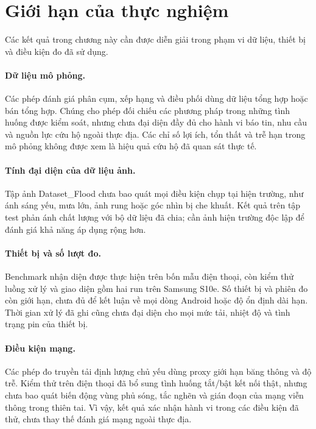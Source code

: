 \section{Giới hạn của thực nghiệm}\label{sec:04-evaluation-limitations}
Các kết quả trong chương này cần được diễn giải trong phạm vi dữ liệu, thiết bị và điều kiện đo đã sử dụng.

\paragraph{Dữ liệu mô phỏng.}
Các phép đánh giá phân cụm, xếp hạng và điều phối dùng dữ liệu tổng hợp hoặc bán tổng hợp. Chúng cho phép đối chiếu các phương pháp trong những tình huống được kiểm soát, nhưng chưa đại diện đầy đủ cho hành vi báo tin, nhu cầu và nguồn lực cứu hộ ngoài thực địa. Các chỉ số lợi ích, tổn thất và trễ hạn trong mô phỏng không được xem là hiệu quả cứu hộ đã quan sát thực tế.

\paragraph{Tính đại diện của dữ liệu ảnh.}
Tập ảnh Dataset\_Flood chưa bao quát mọi điều kiện chụp tại hiện trường, như ánh sáng yếu, mưa lớn, ảnh rung hoặc góc nhìn bị che khuất. Kết quả trên tập test phản ánh chất lượng với bộ dữ liệu đã chia; cần ảnh hiện trường độc lập để đánh giá khả năng áp dụng rộng hơn.

\paragraph{Thiết bị và số lượt đo.}
Benchmark nhận diện được thực hiện trên bốn mẫu điện thoại, còn kiểm thử luồng xử lý và giao diện gồm hai run trên Samsung S10e. Số thiết bị và phiên đo còn giới hạn, chưa đủ để kết luận về mọi dòng Android hoặc độ ổn định dài hạn. Thời gian xử lý đã ghi cũng chưa đại diện cho mọi mức tải, nhiệt độ và tình trạng pin của thiết bị.

\paragraph{Điều kiện mạng.}
Các phép đo truyền tải định lượng chủ yếu dùng proxy giới hạn băng thông và độ trễ. Kiểm thử trên điện thoại đã bổ sung tình huống tắt/bật kết nối thật, nhưng chưa bao quát biến động vùng phủ sóng, tắc nghẽn và gián đoạn của mạng viễn thông trong thiên tai. Vì vậy, kết quả xác nhận hành vi trong các điều kiện đã thử, chưa thay thế đánh giá mạng ngoài thực địa.

